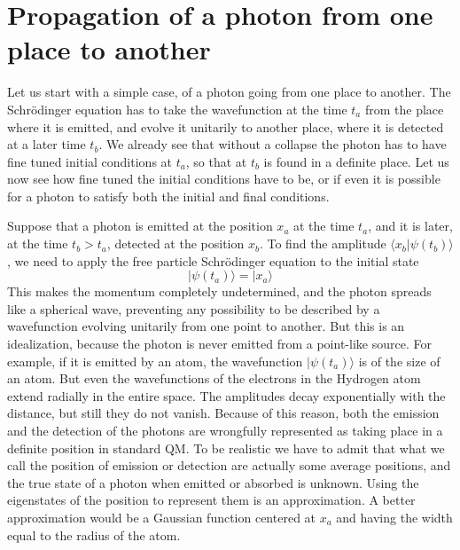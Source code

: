\documentclass[11pt]{amsart}
\theoremstyle{definition}
\theoremstyle{plain}
\begin{document}
\section{Propagation of a photon from one place to another}
\label{s:particle_place2place}

Let us start with a simple case, of a photon going from one place to another. The Schr\"odinger equation has to take the wavefunction at the time $t_a$ from the place where it is emitted, and evolve it unitarily to another place, where it is detected at a later time $t_b$. We already see that without a collapse the photon has to have fine tuned initial conditions at $t_a$, so that at $t_b$ is found in a definite place. Let us now see how fine tuned the initial conditions have to be, or if even it is possible for a photon to satisfy both the initial and final conditions.
 
Suppose that a photon is emitted at the position $x_a$ at the time $t_a$, and it is later, at the time $t_b>t_a$, detected at the position $x_b$.
To find the amplitude $\langle{x_b}|{\psi(t_b)}\rangle$, we need to apply the free particle Schr\"odinger equation to the initial state
\begin{equation}
|{\psi(t_a)}\rangle = |{x_a}\rangle
\end{equation}
This makes the momentum completely undetermined, and the photon spreads like a spherical wave, preventing any possibility to be described by a wavefunction evolving unitarily from one point to another. But this is an idealization, because the photon is never emitted from a point-like source. For example, if it is emitted by an atom, the wavefunction $|{\psi(t_a)}\rangle$ is of the size of an atom. But even the wavefunctions of the electrons in the Hydrogen atom extend radially in the entire space. The amplitudes decay exponentially with the distance, but still they do not vanish.
Because of this reason, both the emission and the detection of the photons are wrongfully represented as taking place in a definite position in standard QM. To be realistic we have to admit that what we call the position of emission or detection are actually some average positions, and the true state of a photon when emitted or absorbed is unknown. Using the eigenstates of the position to represent them is an approximation. A better approximation would be a Gaussian function centered at $x_a$ and having the width equal to the radius of the atom.
\end{document}
